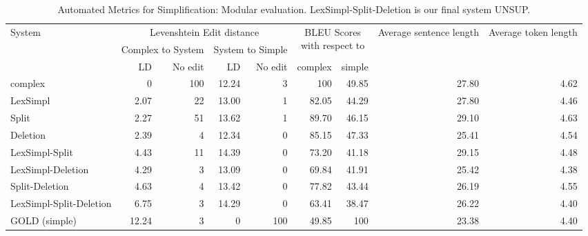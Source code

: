 \documentclass[11pt,a4paper]{article}
\begin{document}
\begin{table*}[htbp]
  \begin{center}
    \begin{footnotesize}
      \begin{tabular}{|p{4.3cm}|rr|rr|rr|r|r|}\hline

        \multirow{3}{*}{System} &
        \multicolumn{4}{|c|}{\parbox{4cm}{Levenshtein Edit distance}}
        & \multicolumn{2}{|c|}{\multirow{2}{*}{\parbox{2cm}{BLEU
              Scores \\ with respect to}}} &
        \multirow{3}{*}{\parbox{1.2cm}{Average sentence length}} &
        \multirow{3}{*}{\parbox{1.2cm}{Average token
            length}}\\ \cline{2-5}

        & \multicolumn{2}{|c|}{\parbox{2cm}{Complex to System}} &
        \multicolumn{2}{|c|}{\parbox{2cm}{System to Simple}} & & & &
        \\ \cline{2-7}
        
        & LD & No edit & LD & No edit & complex & simple & &  \\ \hline
        
        complex & 0 & 100 & 12.24 & 3 & 100 & 49.85 & 27.80 & 4.62 \\
        LexSimpl & 2.07 & 22  & 13.00 & 1 & 82.05 & 44.29 & 27.80 & 4.46 \\
        Split & 2.27 & 51 & 13.62 & 1 & 89.70 & 46.15 & 29.10 & 4.63 \\
        Deletion & 2.39 & 4 & 12.34 & 0 & 85.15 & 47.33 & 25.41 & 4.54 \\
        LexSimpl-Split & 4.43 & 11 & 14.39 & 0 & 73.20 & 41.18 & 29.15 & 4.48 \\
        LexSimpl-Deletion & 4.29 & 3 & 13.09 & 0 & 69.84 & 41.91 & 25.42 & 4.38 \\
        Split-Deletion & 4.63 & 4 & 13.42 & 0 & 77.82 & 43.44 & 26.19 & 4.55 \\
        LexSimpl-Split-Deletion & 6.75 & 3 & 14.29 & 0 & 63.41 & 38.47 & 26.22 & 4.40 \\
        GOLD (simple) & 12.24 & 3 & 0 & 100 & 49.85 & 100 & 23.38 & 4.40 \\ \hline 

      \end{tabular}
      \caption{\small Automated Metrics for Simplification: Modular
        evaluation. LexSimpl-Split-Deletion is our final system
        UNSUP.}\label{tab:modular}
      \vspace{-0.5cm}
    \end{footnotesize}
  \end{center}
\end{table*}
\end{document}
